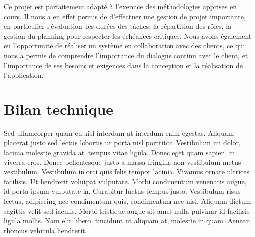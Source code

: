 Ce projet est parfaitement adapté à l'exercice des méthodologies apprises en cours. Il nous a en effet permis de d'effectuer une gestion de projet importante, en particulier l'évaluation des durées des tâches, la répartition des rôles, la gestion du planning pour respecter les échéances critiques.
Nous avons également eu l'opportunité de réaliser un système en collaboration avec des clients, ce qui nous a permis de comprendre l'importance du dialogue continu avec le client, et l'importance de ses besoins et exigences dans la conception et la réalisation de l'application. 




\section{Bilan technique}

Sed ullamcorper quam eu nisl interdum at interdum enim egestas. Aliquam placerat justo sed lectus lobortis ut porta nisl porttitor. Vestibulum mi dolor, lacinia molestie gravida at, tempus vitae ligula. Donec eget quam sapien, in viverra eros. Donec pellentesque justo a massa fringilla non vestibulum metus vestibulum. Vestibulum in orci quis felis tempor lacinia. Vivamus ornare ultrices facilisis. Ut hendrerit volutpat vulputate. Morbi condimentum venenatis augue, id porta ipsum vulputate in. Curabitur luctus tempus justo. Vestibulum risus lectus, adipiscing nec condimentum quis, condimentum nec nisl. Aliquam dictum sagittis velit sed iaculis. Morbi tristique augue sit amet nulla pulvinar id facilisis ligula mollis. Nam elit libero, tincidunt ut aliquam at, molestie in quam. Aenean rhoncus vehicula hendrerit.